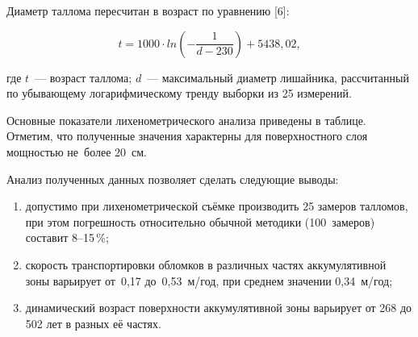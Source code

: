 Диаметр таллома пересчитан в возраст по уравнению [6]:

$$t = 1000\cdot ln{\left(-\frac{1}{d-230}\right)}+5438,02,$$

где $t$~--- возраст таллома; $d$~--- максимальный диаметр лишайника, рассчитанный по убывающему логарифмическому тренду выборки из 25 измерений.

Основные показатели лихенометрического анализа приведены в таблице. Отметим, что полученные значения характерны для поверхностного слоя мощностью не~более 20~см.





\clearpage

Анализ полученных данных позволяет сделать следующие выводы:

\begin{enumerate}[noitemsep]\vspace{-8pt}
  \item допустимо при лихенометрической съёмке производить 25 замеров талломов, при этом погрешность относительно обычной методики (100~замеров) составит 8--15\,\%;
  \item скорость транспортировки обломков в различных частях аккумулятивной зоны варьирует от~0,17 до~0,53~м/год, при среднем значении 0,34~м/год;
  \item динамический возраст поверхности аккумулятивной зоны варьирует от 268 до 502 лет в разных её частях.
\end{enumerate}




